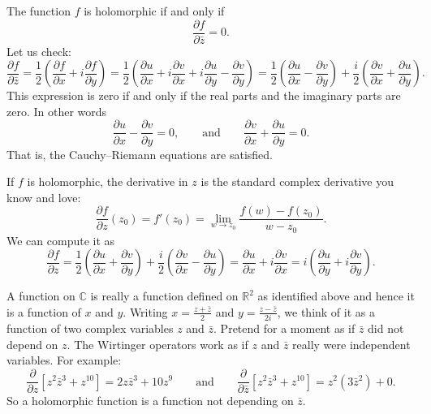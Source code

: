 \documentclass[12pt,openany]{book}
\newcommand{\C}{{\mathbb{C}}}
\newcommand{\R}{{\mathbb{R}}}
\theoremstyle{plain}
\theoremstyle{remark}
\theoremstyle{definition}
\theoremstyle{exercise}
\theoremstyle{example}
\begin{document}
The function $f$ is holomorphic if and only if
\begin{equation*}
\frac{\partial f}{\partial \bar{z}} = 0 .
\end{equation*}
Let us check:
\begin{equation*}
\frac{\partial f}{\partial \bar{z}} 
=
\frac{1}{2}
\left(
\frac{\partial f}{\partial x} + i
\frac{\partial f}{\partial y}
\right)
=
\frac{1}{2}
\left(
\frac{\partial u}{\partial x} 
+ i \frac{\partial v}{\partial x} 
+ i \frac{\partial u}{\partial y}
- \frac{\partial v}{\partial y}
\right) 
=
\frac{1}{2}
\left(
\frac{\partial u}{\partial x} 
- \frac{\partial v}{\partial y}
\right)
+
\frac{i}{2}
\left(
\frac{\partial v}{\partial x} 
+ \frac{\partial u}{\partial y}
\right) .
\end{equation*}
This expression is zero if and only if the real parts and the imaginary
parts are zero.  In other words %
\begin{equation*}
\frac{\partial u}{\partial x} 
- \frac{\partial v}{\partial y}
= 0,
\qquad
\text{and}
\qquad
\frac{\partial v}{\partial x} 
+ \frac{\partial u}{\partial y} = 0
.
\end{equation*}
That is, the Cauchy--Riemann equations are satisfied.

If $f$ is holomorphic, the derivative in $z$ is the standard complex derivative you know and love:
\begin{equation*}
\frac{\partial f}{\partial z} (z_0)
=
f'(z_0)
=
\lim_{w \to z_0} \frac{f(w)-f(z_0)}{w-z_0} .
\end{equation*}
We can compute it as
\begin{equation*}
\frac{\partial f}{\partial z} 
=
\frac{1}{2}
\left(
\frac{\partial u}{\partial x} 
+ \frac{\partial v}{\partial y}
\right)
+
\frac{i}{2}
\left( \frac{\partial v}{\partial x} - \frac{\partial u}{\partial y}
\right) 
=
\frac{\partial u}{\partial x} 
+ i \frac{\partial v}{\partial x}
=
i \left(
\frac{\partial u}{\partial y}
+ i
\frac{\partial v}{\partial y} 
\right)
.
\end{equation*}

A function on $\C$ is really a function defined on
$\R^2$ as identified above and hence it is a function of $x$ and $y$.
Writing
$x = \frac{z+\bar{z}}{2}$ and
$y = \frac{z-\bar{z}}{2i}$, we think of it as a function of two
complex variables $z$ and $\bar{z}$.  Pretend for a moment as if $\bar{z}$ did not
depend on $z$.
The Wirtinger operators
work as if $z$ and $\bar{z}$ really were independent variables.  For example:
\begin{equation*}
\frac{\partial}{\partial z}
\left[ z^2 \bar{z}^3 + z^{10} \right]
=
2z \bar{z}^3 + 10 z^{9}
\qquad
\text{and}
\qquad
\frac{\partial}{\partial \bar{z}}
\left[ z^2 \bar{z}^3 + z^{10} \right]
=
z^2 ( 3 \bar{z}^2 ) + 0 .
\end{equation*}
So a holomorphic function is a function not depending on $\bar{z}$.
\end{document}
